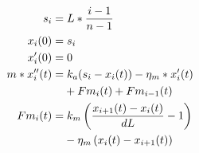 \documentclass{article}
\begin{document}
\begin{align}
    s_i     &= L * \frac{ i-1 }{ n-1 }  \\
    x_i(0)  &= s_i \\
    x'_i(0) &= 0 \\
    m * x''_i(t) &= k_a (s_i - x_i(t)) - \eta_m * x_i'(t)  \\
                 &\phantom{{}=}+ Fm_i(t) + Fm_{i-1}(t) \notag \\
    Fm_i(t) &= k_m \left( \frac{ x_{i+1}(t) - x_i(t) }{ dL } - 1 \right)  \\
            &\phantom{{}=} - \eta_m \left(x_i(t) - x_{i+1}(t) \right) \notag
\end{align}

\end{document}
